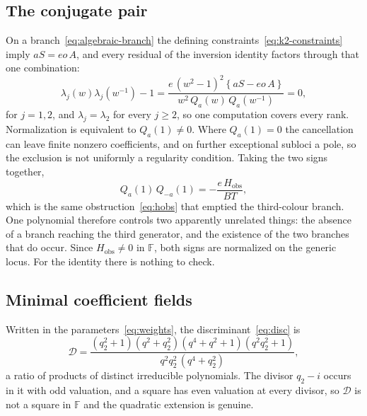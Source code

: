 \documentclass[
  aps,pre,
  reprint,
  superscriptaddress,
  amsmath,amssymb,
  floatfix
]{revtex4-2}
\theoremstyle{plain}
\theoremstyle{definition}
\theoremstyle{remark}
\newcommand{\Fld}{\mathbb{F}}
\newcommand{\Disc}{\mathcal{D}}
\begin{document}
\subsection{The conjugate pair}

On a branch~\eqref{eq:algebraic-branch} the defining
constraints~\eqref{eq:k2-constraints} imply $aS=eo\,A$, and every residual of
the inversion identity factors through that one combination:
\begin{equation}
  \lambda_j(w)\lambda_j(w^{-1})-1
  =\frac{e\,(w^2-1)^2\left\{aS-eo\,A\right\}}{w^2\,Q_a(w)\,Q_a(w^{-1})}=0,
  \label{eq:branch-unitarity}
\end{equation}
for $j=1,2$, and $\lambda_j=\lambda_2$ for every $j\ge2$, so one computation
covers every rank. Normalization is equivalent to $Q_a(1)\ne0$. Where
$Q_a(1)=0$ the cancellation can leave finite nonzero coefficients, and on
further exceptional subloci a pole, so the exclusion is not uniformly a
regularity condition. Taking the two signs together,
\begin{equation}
  Q_a(1)\,Q_{-a}(1)=-\frac{e\,H_{\mathrm{obs}}}{BT},
  \label{eq:normalization-norm}
\end{equation}
which is the same obstruction~\eqref{eq:hobs} that emptied the third-colour
branch. One polynomial therefore controls two apparently unrelated things: the
absence of a branch reaching the third generator, and the existence of the two
branches that do occur. Since $H_{\mathrm{obs}}\ne0$ in $\Fld$, both signs are
normalized on the generic locus. For the identity there is nothing to check.

\subsection{Minimal coefficient fields}

Written in the parameters~\eqref{eq:weights}, the discriminant~\eqref{eq:disc}
is
\begin{equation}
  \Disc=\frac{(q_2^2+1)(q^2+q_2^2)(q^4+q^2+1)(q^2q_2^2+1)}
  {q^2q_2^2\,(q^4+q_2^2)} ,
  \label{eq:disc-explicit}
\end{equation}
a ratio of products of distinct irreducible polynomials. The divisor
$q_2-i$ occurs in it with odd valuation, and a square has even valuation at
every divisor, so $\Disc$ is not a square in $\Fld$ and the quadratic extension
is genuine.
\end{document}
